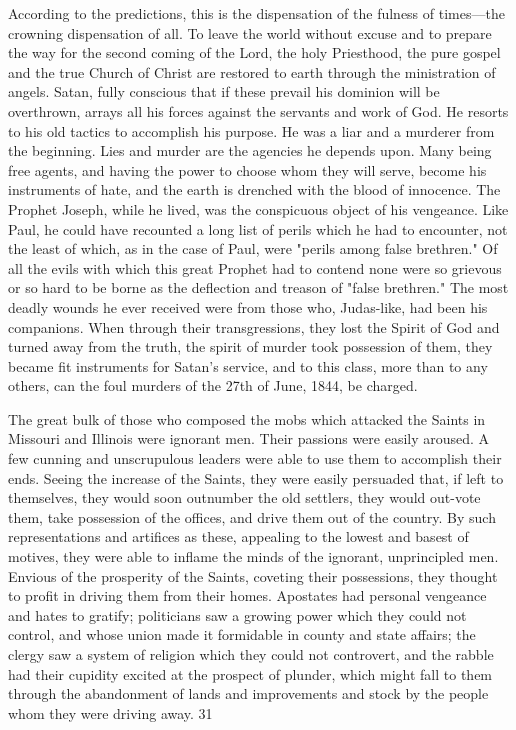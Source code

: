 According to the predictions, this is the dispensation of the fulness of times—the crowning
dispensation of all. To leave the world without excuse and to prepare the way for the second
coming of the Lord, the holy Priesthood, the pure gospel and the true Church of Christ are
restored to earth through the ministration of angels. Satan, fully conscious that if these
prevail his dominion will be overthrown, arrays all his forces against the servants and work
of God. He resorts to his old tactics to accomplish his purpose. He was a liar and a murderer
from the beginning. Lies and murder are the agencies he depends upon. Many being free
agents, and having the power to choose whom they will serve, become his instruments of
hate, and the earth is drenched with the blood of innocence. The Prophet Joseph, while he
lived, was the conspicuous object of his vengeance. Like Paul, he could have recounted a
long list of perils which he had to encounter, not the least of which, as in the case of Paul,
were "perils among false brethren." Of all the evils with which this great Prophet had to
contend none were so grievous or so hard to be borne as the deflection and treason of "false
brethren." The most deadly wounds he ever received were from those who, Judas-like, had
been his companions. When through their transgressions, they lost the Spirit of God and
turned away from the truth, the spirit of murder took possession of them, they became fit
instruments for Satan's service, and to this class, more than to any others, can the foul
murders of the 27th of June, 1844, be charged.

The great bulk of those who composed the mobs which attacked the Saints in Missouri and
Illinois were ignorant men. Their passions were easily aroused. A few cunning and
unscrupulous leaders were able to use them to accomplish their ends. Seeing the increase of
the Saints, they were easily persuaded that, if left to themselves, they would soon outnumber
the old settlers, they would out-vote them, take possession of the offices, and drive them out
of the country. By such representations and artifices as these, appealing to the lowest and
basest of motives, they were able to inflame the minds of the ignorant, unprincipled men.
Envious of the prosperity of the Saints, coveting their possessions, they thought to profit in
driving them from their homes. Apostates had personal vengeance and hates to gratify;
politicians saw a growing power which they could not control, and whose union made it
formidable in county and state affairs; the clergy saw a system of religion which they could
not controvert, and the rabble had their cupidity excited at the prospect of plunder, which
might fall to them through the abandonment of lands and improvements and stock by the
people whom they were driving away. 31

